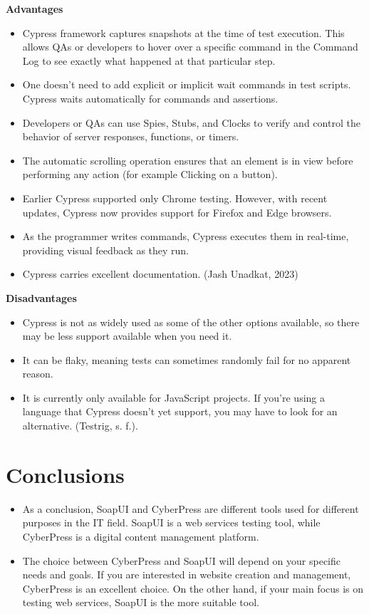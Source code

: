 \documentclass{article}
\begin{document}
	\textbf{Advantages}
	
	\begin{itemize}
		\item Cypress framework captures snapshots at the time of test execution. This allows QAs or developers to hover over a specific command in the Command Log to see exactly what happened at that particular step.
		\item One doesn’t need to add explicit or implicit wait commands in test scripts. Cypress waits automatically for commands and assertions.
		\item Developers or QAs can use Spies, Stubs, and Clocks to verify and control the behavior of server responses, functions, or timers.
		\item The automatic scrolling operation ensures that an element is in view before performing any action (for example Clicking on a button).
		\item Earlier Cypress supported only Chrome testing. However, with recent updates, Cypress now provides support for Firefox and Edge browsers.
		\item As the programmer writes commands, Cypress executes them in real-time, providing visual feedback as they run.
		\item Cypress carries excellent documentation.
		(Jash Unadkat, 2023)
	\end{itemize}
	
	
	\textbf{Disadvantages}
	
	\begin{itemize}
		\item Cypress is not as widely used as some of the other options available, so there may be less support available when you need it.
		\item It can be flaky, meaning tests can sometimes randomly fail for no apparent reason.
		\item It is currently only available for JavaScript projects. If you’re using a language that Cypress doesn’t yet support, you may have to look for an alternative.
		(Testrig, s. f.).
	\end{itemize}
	
	
	\section{Conclusions}
	\begin{itemize}
		\item As a conclusion, SoapUI and CyberPress are different tools used for different purposes in the IT field. SoapUI is a web services testing tool, while CyberPress is a digital content management platform.
		\item The choice between CyberPress and SoapUI will depend on your specific needs and goals. If you are interested in website creation and management, CyberPress is an excellent choice. On the other hand, if your main focus is on testing web services, SoapUI is the more suitable tool.
	\end{itemize}
	
\end{document}
